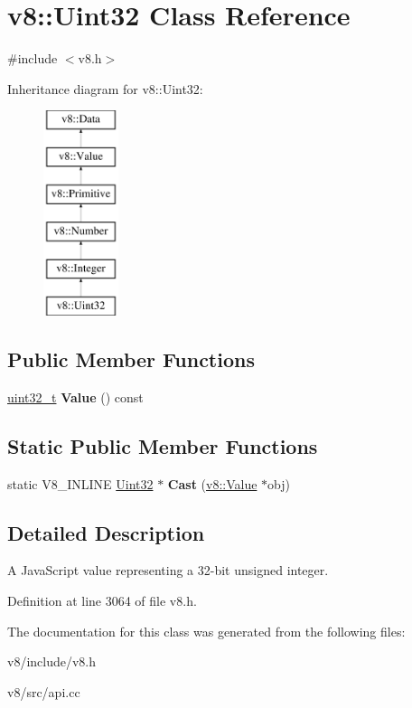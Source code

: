 \hypertarget{classv8_1_1Uint32}{}\section{v8\+:\+:Uint32 Class Reference}
\label{classv8_1_1Uint32}


{\ttfamily \#include $<$v8.\+h$>$}

Inheritance diagram for v8\+:\+:Uint32\+:\begin{figure}[H]
\begin{center}
\leavevmode
\includegraphics[height=6.000000cm]{classv8_1_1Uint32}
\end{center}
\end{figure}
\subsection*{Public Member Functions}
\begin{DoxyCompactItemize}
\item 
\mbox{\label{classv8_1_1Uint32_af0b7097435b29db75b8358eecb2bdb44}} 
\mbox{\hyperlink{classuint32__t}{uint32\+\_\+t}} {\bfseries Value} () const
\end{DoxyCompactItemize}
\subsection*{Static Public Member Functions}
\begin{DoxyCompactItemize}
\item 
\mbox{\label{classv8_1_1Uint32_a41a1785c19221868e338b93faa383b62}} 
static V8\+\_\+\+I\+N\+L\+I\+NE \mbox{\hyperlink{classv8_1_1Uint32}{Uint32}} $\ast$ {\bfseries Cast} (\mbox{\hyperlink{classv8_1_1Value}{v8\+::\+Value}} $\ast$obj)
\end{DoxyCompactItemize}


\subsection{Detailed Description}
A Java\+Script value representing a 32-\/bit unsigned integer. 

Definition at line 3064 of file v8.\+h.



The documentation for this class was generated from the following files\+:\begin{DoxyCompactItemize}
\item 
v8/include/v8.\+h\item 
v8/src/api.\+cc\end{DoxyCompactItemize}
